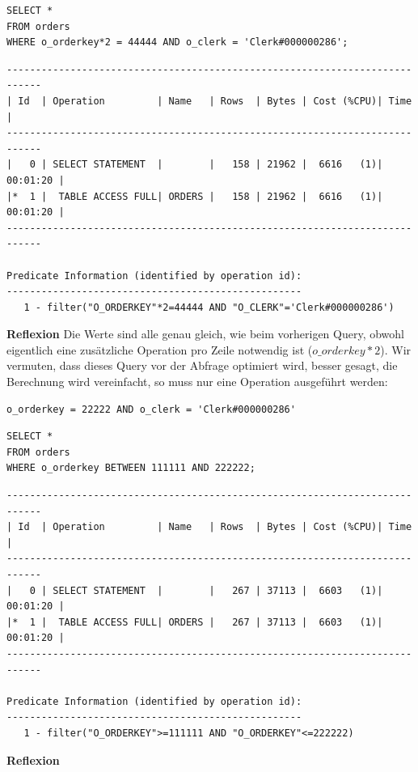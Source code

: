 \documentclass[10pt]{article}
\begin{document}
\begin{lstlisting}[style=sql]
SELECT *
FROM orders
WHERE o_orderkey*2 = 44444 AND o_clerk = 'Clerk#000000286';
\end{lstlisting}
\begin{lstlisting}[style=queryexecutionplan]
----------------------------------------------------------------------------
| Id  | Operation         | Name   | Rows  | Bytes | Cost (%CPU)| Time     |
----------------------------------------------------------------------------
|   0 | SELECT STATEMENT  |        |   158 | 21962 |  6616   (1)| 00:01:20 |
|*  1 |  TABLE ACCESS FULL| ORDERS |   158 | 21962 |  6616   (1)| 00:01:20 |
----------------------------------------------------------------------------

Predicate Information (identified by operation id):
---------------------------------------------------
   1 - filter("O_ORDERKEY"*2=44444 AND "O_CLERK"='Clerk#000000286')
\end{lstlisting}
\textbf{Reflexion} \newline
Die Werte sind alle genau gleich, wie beim vorherigen Query, obwohl eigentlich 
eine zusätzliche Operation pro Zeile notwendig ist ($o\_orderkey*2$). Wir 
vermuten, dass dieses Query vor der Abfrage optimiert wird, besser gesagt, die
Berechnung wird vereinfacht, so muss nur eine Operation ausgeführt werden:
\begin{lstlisting}[style=sqlNoTitle]
o_orderkey = 22222 AND o_clerk = 'Clerk#000000286'
\end{lstlisting}

\newpage
\begin{lstlisting}[style=sql]
SELECT *
FROM orders
WHERE o_orderkey BETWEEN 111111 AND 222222;
\end{lstlisting}
\begin{lstlisting}[style=queryexecutionplan]
----------------------------------------------------------------------------
| Id  | Operation         | Name   | Rows  | Bytes | Cost (%CPU)| Time     |
----------------------------------------------------------------------------
|   0 | SELECT STATEMENT  |        |   267 | 37113 |  6603   (1)| 00:01:20 |
|*  1 |  TABLE ACCESS FULL| ORDERS |   267 | 37113 |  6603   (1)| 00:01:20 |
----------------------------------------------------------------------------

Predicate Information (identified by operation id):
---------------------------------------------------
   1 - filter("O_ORDERKEY">=111111 AND "O_ORDERKEY"<=222222)
\end{lstlisting}
\textbf{Reflexion} \newline
\end{document}
